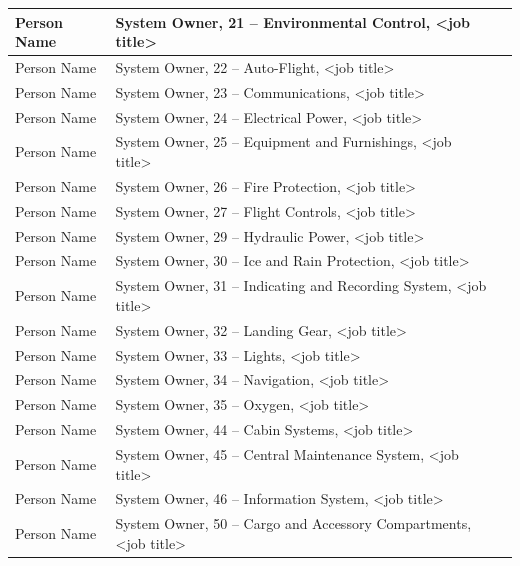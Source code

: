 \begin{table}[h]
\begin{tabular}{|p{1.5in}|p{3.5in}|p{1.5in}|}
Person Name & System Owner, 21 -- Environmental Control, \textless job title\textgreater & \\[1.2cm] \hline
Person Name & System Owner, 22 -- Auto-Flight, \textless job title\textgreater & \\[1.2cm] \hline
Person Name & System Owner, 23 -- Communications, \textless job title\textgreater & \\[1.2cm] \hline
Person Name & System Owner, 24 -- Electrical Power, \textless job title\textgreater & \\[1.2cm] \hline
Person Name & System Owner, 25 -- Equipment and Furnishings, \textless job title\textgreater & \\[1.2cm] \hline
Person Name & System Owner, 26 -- Fire Protection, \textless job title\textgreater & \\[1.2cm] \hline
Person Name & System Owner, 27 -- Flight Controls, \textless job title\textgreater & \\[1.2cm] \hline
Person Name & System Owner, 29 -- Hydraulic Power, \textless job title\textgreater & \\[1.2cm] \hline
Person Name & System Owner, 30 -- Ice and Rain Protection, \textless job title\textgreater & \\[1.2cm] \hline
Person Name & System Owner, 31 -- Indicating and Recording System, \textless job title\textgreater & \\[1.2cm] \hline
Person Name & System Owner, 32 -- Landing Gear, \textless job title\textgreater & \\[1.2cm] \hline
Person Name & System Owner, 33 -- Lights, \textless job title\textgreater & \\[1.2cm] \hline
Person Name & System Owner, 34 -- Navigation, \textless job title\textgreater & \\[1.2cm] \hline
Person Name & System Owner, 35 -- Oxygen, \textless job title\textgreater & \\[1.2cm] \hline
Person Name & System Owner, 44 -- Cabin Systems, \textless job title\textgreater & \\[1.2cm] \hline
Person Name & System Owner, 45 -- Central Maintenance System, \textless job title\textgreater & \\[1.2cm] \hline
Person Name & System Owner, 46 -- Information System, \textless job title\textgreater & \\[1.2cm] \hline
Person Name & System Owner, 50 -- Cargo and Accessory Compartments, \textless job title\textgreater & \\[1.2cm] \hline


\end{tabular}
\end{table}
